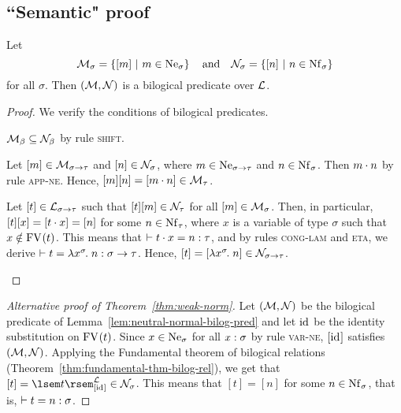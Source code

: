 
\subsection{``Semantic" proof} \label{sec:log-pred-proof}

\begin{lem} \label{lem:neutral-normal-bilog-pred}
Let
\[ \scomp{\struct{M}}{\sigma} = \setof{[m]}{m \in \Ne[\sigma]} \quad\text{and}\quad
   \scomp{\struct{N}}{\sigma} = \setof{[n]}{n \in \Nf[\sigma]} \]
for all $\sigma$.
Then $(\mathcal{M}, \mathcal{N})$ is a bilogical predicate over $\mathcal{L}$.
\begin{proof}
We verify the conditions of bilogical predicates.
\begin{enum}
\item $\mathcal{M}_{\beta} \subseteq \mathcal{N}_{\beta}$ by rule \textsc{shift}.

\item Let $[m] \in \mathcal{M}_{\sigma \to \tau}$ and $[n] \in \mathcal{N}_{\sigma}$, where $m \in \Ne[\functy{\sigma}{\tau}]$ and $n \in \Nf[\sigma]$. Then $m \cdot n$ by rule \textsc{app-ne}. Hence, $[m][n] = [m \cdot n] \in \mathcal{M}_{\tau}$.

\item Let $[t] \in \mathcal{L}_{\sigma \to \tau}$ such that $[t][m] \in \mathcal{N}_{\tau}$ for all $[m] \in \mathcal{M}_{\sigma}$. Then, in particular, $[t][x] = [t \cdot x] = [n]$ for some $n \in \Nf[\tau]$, where $x$ is a variable of type $\sigma$ such that $x \notin \mathrm{FV}_{}(t)$. This means that $\vdash t \cdot x = n : \tau$, and by rules \textsc{cong-lam} and \textsc{eta}, we derive $\vdash t = \lambda x^{\sigma}\hspace{-1pt}.\;n : \sigma \to \tau$. Hence, $[t] = [\lambda x^{\sigma}\hspace{-1pt}.\;n] \in \mathcal{N}_{\sigma \to \tau}$. \qedhere
\end{enum}
\end{proof}
\end{lem}

\begin{proof}[Alternative proof of Theorem~\ref{thm:weak-norm}]
Let $(\mathcal{M}, \mathcal{N})$ be the bilogical predicate of Lemma~\ref{lem:neutral-normal-bilog-pred} and let $\mathrm{id}_{}$ be the identity substitution on $\mathrm{FV}_{}(t)$. Since $x \in \Ne[\sigma]$ for all $x : \sigma$ by rule \textsc{var-ne}, $[\mathrm{id}_{}]$ satisfies $(\mathcal{M}, \mathcal{N})$. Applying the Fundamental theorem of bilogical relations (Theorem~\ref{thm:fundamental-thm-bilog-rel}), we get that $[t] = \sint[\tmmod]{t}{[\idsub]} \in \scomp{\struct{N}}{\sigma}$. This means that $[t] = [n]$ for some $n \in \Nf[\sigma]$, that is, $\vdash t = n : \sigma$.
\end{proof}

